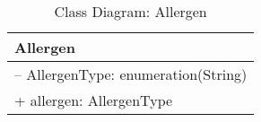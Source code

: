 \begin{table}[ht]
\centering
\caption{Class Diagram: Allergen}

\hspace{1em}
\renewcommand{\arraystretch}{1.7}

\begin{tabular}{|l|}
\hline
\textbf{Allergen} \\
\hline
– AllergenType: enumeration(String) \\
+ allergen: AllergenType \\
\hline
\end{tabular}
\end{table}
